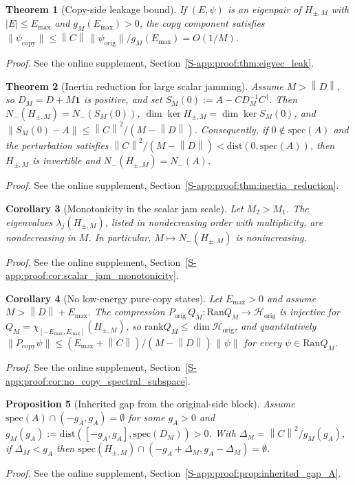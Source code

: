 \documentclass[11pt]{article}
\numberwithin{equation}{section}
\newtheorem{theorem}{Theorem}[section]
\newtheorem{proposition}[theorem]{Proposition}
\newtheorem{corollary}[theorem]{Corollary}
\theoremstyle{definition}
\theoremstyle{remark}
\newcommand{\proofsuppref}[1]{%
  \par\noindent\emph{Proof.} See the online supplement, Section~\ref{S-#1}.\par\medskip
}
\newcommand{\Hil}{\mathcal{H}}
\newcommand{\Id}{\mathbf{1}}
\newcommand{\spec}{\mathrm{spec}}
\newcommand{\dist}{\mathrm{dist}}
\newcommand{\rank}{\mathrm{rank}}
\newcommand{\Ran}{\mathrm{Ran}}
\newcommand{\opnorm}[1]{\left\lVert#1\right\rVert}
\begin{document}
\begin{theorem}[Copy-side leakage bound]\label{thm:eigvec_leak}
If $(E,\psi)$ is an eigenpair of $H_{\pm,M}$ with $|E|\le E_{\max}$ and $g_M(E_{\max})>0$,
the copy component satisfies $\|\psi_{\mathrm{copy}}\|\le
\opnorm{C}\,\|\psi_{\mathrm{orig}}\|/g_M(E_{\max})=O(1/M)$.
\end{theorem}
\proofsuppref{app:proof:thm:eigvec_leak}

\begin{theorem}[Inertia reduction for large scalar jamming]\label{thm:inertia_reduction}
Assume $M>\opnorm{D}$, so $D_M=D+M\Id$ is positive, and set $S_M(0):=A-CD_M^{-1}C^\dagger$. Then
$N_-(H_{\pm,M})=N_-(S_M(0))$, $\dim\ker H_{\pm,M}=\dim\ker S_M(0)$, and
$\|S_M(0)-A\|\le\opnorm{C}^2/(M-\opnorm{D})$. Consequently, if $0\notin\spec(A)$ and the
perturbation satisfies $\opnorm{C}^2/(M-\opnorm{D})<\dist(0,\spec(A))$, then $H_{\pm,M}$ is
invertible and $N_-(H_{\pm,M})=N_-(A)$.
\end{theorem}
\proofsuppref{app:proof:thm:inertia_reduction}

\begin{corollary}[Monotonicity in the scalar jam scale]\label{cor:scalar_jam_monotonicity}
Let $M_2>M_1$. The eigenvalues $\lambda_j(H_{\pm,M})$, listed in nondecreasing order with
multiplicity, are nondecreasing in $M$. In particular, $M\mapsto N_-(H_{\pm,M})$ is nonincreasing.
\end{corollary}
\proofsuppref{app:proof:cor:scalar_jam_monotonicity}

\begin{corollary}[No low-energy pure-copy states]\label{cor:no_copy_spectral_subspace}
Let $E_{\max}>0$ and assume $M>\opnorm{D}+E_{\max}$. The compression
$P_{\mathrm{orig}}\,Q_M:\Ran Q_M\to\Hil_{\mathrm{orig}}$ is injective for
$Q_M=\chi_{[-E_{\max},E_{\max}]}(H_{\pm,M})$, so $\rank Q_M\le\dim\Hil_{\mathrm{orig}}$, and
quantitatively $\|P_{\mathrm{copy}}\psi\|\le (E_{\max}+\opnorm C)/(M-\opnorm D)\,\|\psi\|$ for
every $\psi\in\Ran Q_M$.
\end{corollary}
\proofsuppref{app:proof:cor:no_copy_spectral_subspace}

\begin{proposition}[Inherited gap from the original-side block]\label{prop:inherited_gap_A}
Assume $\spec(A)\cap(-g_A,g_A)=\emptyset$ for some $g_A>0$ and
$g_M(g_A):=\dist([-g_A,g_A],\spec(D_M))>0$. With $\Delta_M=\opnorm{C}^2/g_M(g_A)$, if
$\Delta_M<g_A$ then $\spec(H_{\pm,M})\cap(-g_A+\Delta_M,g_A-\Delta_M)=\emptyset$.
\end{proposition}
\proofsuppref{app:proof:prop:inherited_gap_A}
\end{document}
